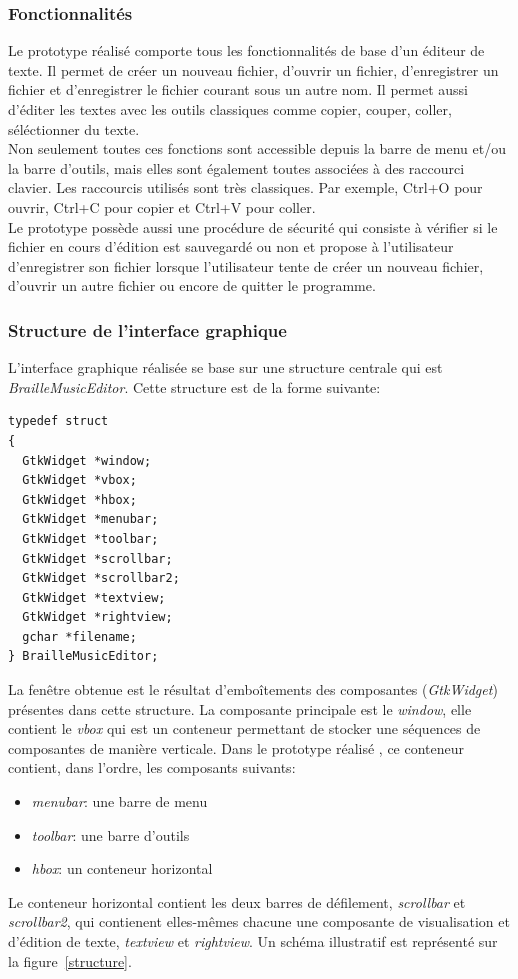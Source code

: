 \subsubsection*{Fonctionnalités}
Le prototype réalisé comporte tous les fonctionnalités de base d'un
éditeur de texte. Il permet de créer un nouveau fichier, d'ouvrir un
fichier, d'enregistrer un fichier et d'enregistrer le fichier courant
sous un autre nom. Il permet aussi d'éditer les textes avec les outils
classiques comme copier, couper, coller, séléctionner du texte.
\\ Non seulement toutes ces fonctions sont accessible depuis la barre
de menu et/ou la barre d'outils, mais elles sont également toutes associées
à des raccourci clavier. Les raccourcis utilisés sont très
classiques. Par exemple, Ctrl+O pour ouvrir, Ctrl+C pour copier et
Ctrl+V pour coller.
\\ Le prototype possède aussi une procédure de
sécurité qui consiste à vérifier si le fichier en cours d'édition est
sauvegardé ou non et propose à l'utilisateur d'enregistrer son
fichier lorsque l'utilisateur tente de créer un nouveau fichier,
d'ouvrir un autre fichier ou encore de quitter le programme.

\subsubsection*{Structure de l'interface graphique}
L'interface graphique réalisée se base sur une structure centrale qui
est \textit{BrailleMusicEditor}. Cette structure est de la forme
suivante:
\begin{verbatim}
typedef struct
{
  GtkWidget *window;
  GtkWidget *vbox; 
  GtkWidget *hbox; 
  GtkWidget *menubar;
  GtkWidget *toolbar;
  GtkWidget *scrollbar;
  GtkWidget *scrollbar2;
  GtkWidget *textview;
  GtkWidget *rightview;
  gchar *filename;
} BrailleMusicEditor;
\end{verbatim}

La fenêtre obtenue est le résultat d'emboîtements des composantes
(\textit{GtkWidget}) présentes dans cette structure.  La composante
principale est le \textit{window}, elle contient le \textit{vbox} qui
est un conteneur permettant de stocker une séquences de composantes de
manière verticale. Dans le prototype réalisé , ce conteneur contient,
dans l'ordre, les composants suivants:
\begin{itemize}
\item \textit{menubar}: une barre de menu
\item \textit{toolbar}: une barre d'outils
\item \textit{hbox}: un conteneur horizontal
\end{itemize}
Le conteneur horizontal contient les deux barres de défilement,
\textit{scrollbar} et \textit{scrollbar2}, qui contienent elles-mêmes
chacune une composante de visualisation et d'édition de texte,
\textit{textview} et \textit{rightview}.  Un schéma illustratif est
représenté sur la figure~\ref{structure}.

